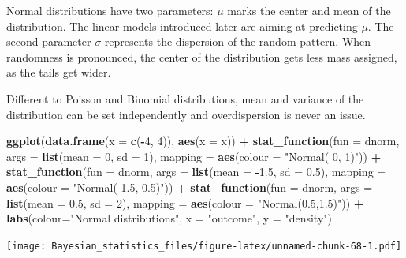 \documentclass[]{svmono}
\newenvironment{Shaded}{\begin{snugshade}}{\end{snugshade}}
\newcommand{\KeywordTok}[1]{\textcolor[rgb]{0.13,0.29,0.53}{\textbf{#1}}}
\newcommand{\DataTypeTok}[1]{\textcolor[rgb]{0.13,0.29,0.53}{#1}}
\newcommand{\DecValTok}[1]{\textcolor[rgb]{0.00,0.00,0.81}{#1}}
\newcommand{\FloatTok}[1]{\textcolor[rgb]{0.00,0.00,0.81}{#1}}
\newcommand{\StringTok}[1]{\textcolor[rgb]{0.31,0.60,0.02}{#1}}
\newcommand{\OperatorTok}[1]{\textcolor[rgb]{0.81,0.36,0.00}{\textbf{#1}}}
\newcommand{\NormalTok}[1]{#1}
\theoremstyle{definition}
\theoremstyle{definition}
\theoremstyle{definition}
\theoremstyle{remark}
\begin{document}
Normal distributions have two parameters: \(\mu\) marks the center and
mean of the distribution. The linear models introduced later are aiming
at predicting \(\mu\). The second parameter \(\sigma\) represents the
dispersion of the random pattern. When randomness is pronounced, the
center of the distribution gets less mass assigned, as the tails get
wider.

Different to Poisson and Binomial distributions, mean and variance of
the distribution can be set independently and overdispersion is never an
issue.

\begin{Shaded}
\begin{Highlighting}[]
\KeywordTok{ggplot}\NormalTok{(}\KeywordTok{data.frame}\NormalTok{(}\DataTypeTok{x =} \KeywordTok{c}\NormalTok{(}\OperatorTok{-}\DecValTok{4}\NormalTok{, }\DecValTok{4}\NormalTok{)), }\KeywordTok{aes}\NormalTok{(}\DataTypeTok{x =}\NormalTok{ x)) }\OperatorTok{+}
\StringTok{  }\KeywordTok{stat_function}\NormalTok{(}\DataTypeTok{fun =}\NormalTok{ dnorm, }\DataTypeTok{args =} \KeywordTok{list}\NormalTok{(}\DataTypeTok{mean =} \DecValTok{0}\NormalTok{, }\DataTypeTok{sd =} \DecValTok{1}\NormalTok{), }\DataTypeTok{mapping =} \KeywordTok{aes}\NormalTok{(}\DataTypeTok{colour =} \StringTok{"Normal( 0, 1)"}\NormalTok{)) }\OperatorTok{+}
\StringTok{  }\KeywordTok{stat_function}\NormalTok{(}\DataTypeTok{fun =}\NormalTok{ dnorm, }\DataTypeTok{args =} \KeywordTok{list}\NormalTok{(}\DataTypeTok{mean =} \OperatorTok{-}\FloatTok{1.5}\NormalTok{, }\DataTypeTok{sd =} \FloatTok{0.5}\NormalTok{), }\DataTypeTok{mapping =} \KeywordTok{aes}\NormalTok{(}\DataTypeTok{colour =} \StringTok{"Normal(-1.5, 0.5)"}\NormalTok{)) }\OperatorTok{+}
\StringTok{  }\KeywordTok{stat_function}\NormalTok{(}\DataTypeTok{fun =}\NormalTok{ dnorm, }\DataTypeTok{args =} \KeywordTok{list}\NormalTok{(}\DataTypeTok{mean =} \FloatTok{0.5}\NormalTok{, }\DataTypeTok{sd =} \DecValTok{2}\NormalTok{), }\DataTypeTok{mapping =} \KeywordTok{aes}\NormalTok{(}\DataTypeTok{colour =} \StringTok{"Normal(0.5,1.5)"}\NormalTok{)) }\OperatorTok{+}
\StringTok{  }\KeywordTok{labs}\NormalTok{(}\DataTypeTok{colour=}\StringTok{"Normal distributions"}\NormalTok{, }\DataTypeTok{x =} \StringTok{"outcome"}\NormalTok{, }\DataTypeTok{y =} \StringTok{"density"}\NormalTok{)}
\end{Highlighting}
\end{Shaded}

\texttt{[image: Bayesian\_statistics\_files/figure-latex/unnamed-chunk-68-1.pdf]}
\end{document}
